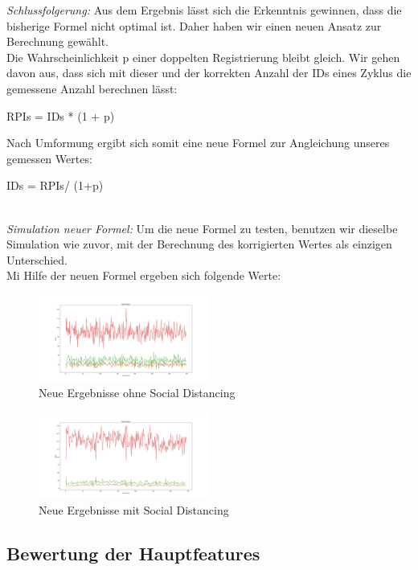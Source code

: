\documentclass[conference]{IEEEtran}
\begin{document}
\textit{Schlussfolgerung:}
Aus dem Ergebnis lässt sich die Erkenntnis gewinnen, dass die bisherige Formel nicht optimal ist. Daher haben wir einen neuen Ansatz zur Berechnung gewählt.\\
Die Wahrscheinlichkeit p einer doppelten Registrierung bleibt gleich. Wir gehen davon aus, dass sich mit dieser und der korrekten Anzahl der IDs eines Zyklus die gemessene Anzahl berechnen lässt:\\
\centerline{RPIs = IDs * (1 + p) }
Nach Umformung ergibt sich somit eine neue Formel zur Angleichung unseres gemessen Wertes:\\
\centerline{IDs = RPIs/ (1+p)}\\

\textit{Simulation neuer Formel:}
Um die neue Formel zu testen, benutzen wir dieselbe Simulation wie zuvor, mit der Berechnung des korrigierten Wertes als einzigen Unterschied.\\
Mi Hilfe der neuen Formel ergeben sich folgende Werte:

\begin{figure}[h]
	\centering
	\includegraphics[width=0.5\textwidth]{"Mast_Data_Plotted"}
	\caption{Neue Ergebnisse ohne Social Distancing}
\end{figure}

\begin{figure}[h]
	\centering
	\includegraphics[width=0.5\textwidth]{"Mast_Data_Plotted_Social_Distancing"}
	\caption{Neue Ergebnisse mit Social Distancing}
\end{figure}


\subsection{Bewertung der Hauptfeatures}
\end{document}
